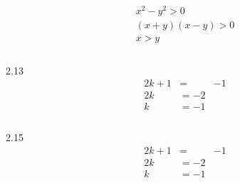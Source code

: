 \documentclass{article}
\begin{document}
\begin{center}
\begin{align*}
  x^2 - y^2 > 0\\
  (x+y)(x-y) > 0\\
  x > y\\
\end{align*}\\
{\Huge 2.13}
\begin{align*}
  2k + 1 &=& -1\\
  2k &= -2\\
  k &= -1\\
\end{align*}\\
{\Huge 2.15}
\begin{align*}
  2k + 1 &=& -1\\
  2k &= -2\\
  k &= -1\\
\end{align*}\\
\end{center}
\end{document}
